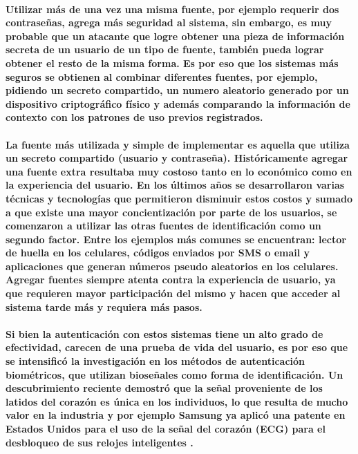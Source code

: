 \documentclass{article}
\begin{document}
\paragraph{
Utilizar más de una vez una misma fuente, por ejemplo requerir dos contraseñas, agrega más seguridad al sistema, sin embargo, es muy probable que un atacante que logre obtener una pieza de información secreta de un usuario de un tipo de fuente, también pueda lograr obtener el resto de la misma forma. Es por eso que los sistemas más seguros se obtienen al combinar diferentes fuentes, por ejemplo, pidiendo un secreto compartido, un numero aleatorio generado por un dispositivo criptográfico físico y además comparando la información de contexto con los patrones de uso previos registrados.
}
\paragraph{
La fuente más utilizada y simple de implementar es aquella que utiliza un secreto compartido (usuario y contraseña). Históricamente agregar una fuente extra resultaba muy costoso tanto en lo económico como en la experiencia del usuario. En los últimos años se desarrollaron varias técnicas y tecnologías que permitieron disminuir estos costos y sumado a que existe una mayor concientización por parte de los usuarios, se comenzaron a utilizar las otras fuentes de identificación como un segundo factor. Entre los ejemplos más comunes se encuentran: lector de huella en los celulares, códigos enviados por SMS o email y aplicaciones que generan números pseudo aleatorios en los celulares. Agregar fuentes siempre atenta contra la experiencia de usuario, ya que requieren mayor participación del mismo y hacen que acceder al sistema tarde más y requiera más pasos.
}
\paragraph{
Si bien la autenticación con estos sistemas tiene un alto grado de efectividad, carecen de una prueba de vida del usuario, es por eso que se intensificó la investigación en los métodos de autenticación biométricos, que utilizan bioseñales como forma de identificación. Un descubrimiento reciente demostró que la señal proveniente de los latidos del corazón es única en los individuos, lo que resulta de mucho valor en la industria y por ejemplo Samsung ya aplicó una patente en Estados Unidos para el uso de la señal del corazón (ECG) para el desbloqueo de sus relojes inteligentes \cite{samsung2016}.
}
\end{document}
